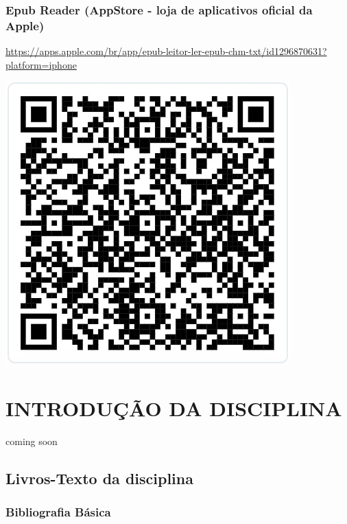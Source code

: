 \documentclass[
]{book}
\begin{document}
\subsection{\texorpdfstring{\textbf{Epub Reader (AppStore - loja de aplicativos oficial da Apple)}}{Epub Reader (AppStore - loja de aplicativos oficial da Apple)}}\label{epub-reader-appstore---loja-de-aplicativos-oficial-da-apple}

\url{https://apps.apple.com/br/app/epub-leitor-ler-epub-chm-txt/id1296870631?platform=iphone}

\includegraphics{images/qr-code/leitor_ebook/AppleEpubReader.jpg}

\chapter*{INTRODUÇÃO DA DISCIPLINA}\label{introduuxe7uxe3o-da-disciplina}

coming soon

\section{Livros-Texto da disciplina}\label{livros-texto-da-disciplina}

\subsection{Bibliografia Básica}\label{bibliografia-buxe1sica}
\end{document}
